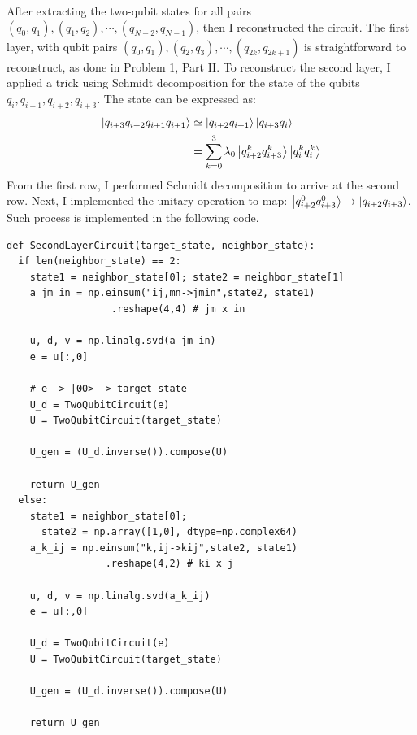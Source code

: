 \documentclass[a4paper, 11pt]{article}
\begin{document}
After extracting the two-qubit states for all pairs ${(q_0, q_1), (q_1, q_2), \cdots, (q_{N-2}, q_{N-1})}$, then I reconstructed the circuit. 
The first layer, with qubit pairs ${(q_0, q_1), (q_2, q_3), \cdots, (q_{2k}, q_{2k+1})}$ is straightforward to reconstruct, as done in Problem 1, Part II.
To reconstruct the second layer, I applied a trick using Schmidt decomposition for the state of the qubits $q_i , q_{i+1}, q_{i+2} , q_{i+3}$. The state can be expressed as:
\begin{align}
  \ket{q_{i+3} q_{i+2} q_{i+1} q_{i+1}} &\simeq \ket{q_{i+2} q_{i+1}}\ket{q_{i+3} q_{i}} \\
                                        &=\sum_{k=0}^3 \lambda_0 \ket{q_{i+2}^k q_{i+3}^k}\ket{q_{i}^k q_{i}^k}
\end{align}
From the first row, I performed Schmidt decomposition to arrive at the second row.
Next, I implemented the unitary operation to map: $\ket{q_{i+2}^0 q_{i+3}^0} \rightarrow \ket{q_{i+2} q_{i+3}}$.
Such process is implemented in the following code. 
\begin{verbatim}
def SecondLayerCircuit(target_state, neighbor_state):
  if len(neighbor_state) == 2:
    state1 = neighbor_state[0]; state2 = neighbor_state[1]
    a_jm_in = np.einsum("ij,mn->jmin",state2, state1)
                  .reshape(4,4) # jm x in 

    u, d, v = np.linalg.svd(a_jm_in)
    e = u[:,0]
    
    # e -> |00> -> target state
    U_d = TwoQubitCircuit(e)
    U = TwoQubitCircuit(target_state)
    
    U_gen = (U_d.inverse()).compose(U)
    
    return U_gen
  else:
    state1 = neighbor_state[0]; 
      state2 = np.array([1,0], dtype=np.complex64)
    a_k_ij = np.einsum("k,ij->kij",state2, state1)
                 .reshape(4,2) # ki x j 
    
    u, d, v = np.linalg.svd(a_k_ij)
    e = u[:,0]
    
    U_d = TwoQubitCircuit(e)
    U = TwoQubitCircuit(target_state)
    
    U_gen = (U_d.inverse()).compose(U)

    return U_gen
\end{verbatim}




\end{document}
